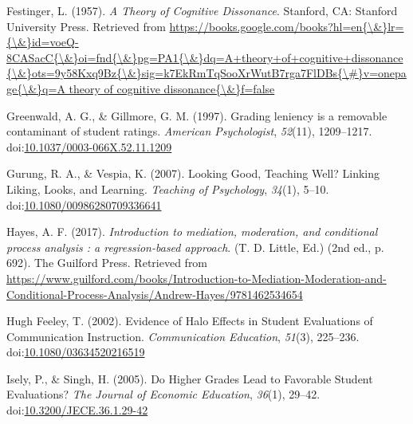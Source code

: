 \documentclass[man]{apa6}
\theoremstyle{definition}
\theoremstyle{definition}
\theoremstyle{definition}
\theoremstyle{remark}
\begin{document}
\leavevmode\hypertarget{ref-Festinger1957}{}%
Festinger, L. (1957). \emph{A Theory of Cognitive Dissonance}. Stanford,
CA: Stanford University Press. Retrieved from
\href{https://books.google.com/books?hl=en\%7B/\&\%7Dlr=\%7B/\&\%7Did=voeQ-8CASacC\%7B/\&\%7Doi=fnd\%7B/\&\%7Dpg=PA1\%7B/\&\%7Ddq=A+theory+of+cognitive+dissonance\%7B/\&\%7Dots=9y58Kxq9Bz\%7B/\&\%7Dsig=k7EkRmTqSooXrWutB7rga7FlDBs\%7B/\#\%7Dv=onepage\%7B/\&\%7Dq=A\%20theory\%20of\%20cognitive\%20dissonance\%7B/\&\%7Df=false}{https://books.google.com/books?hl=en\{\textbackslash{}\&\}lr=\{\textbackslash{}\&\}id=voeQ-8CASacC\{\textbackslash{}\&\}oi=fnd\{\textbackslash{}\&\}pg=PA1\{\textbackslash{}\&\}dq=A+theory+of+cognitive+dissonance\{\textbackslash{}\&\}ots=9y58Kxq9Bz\{\textbackslash{}\&\}sig=k7EkRmTqSooXrWutB7rga7FlDBs\{\textbackslash{}\#\}v=onepage\{\textbackslash{}\&\}q=A theory of cognitive dissonance\{\textbackslash{}\&\}f=false}

\leavevmode\hypertarget{ref-Greenwald1997}{}%
Greenwald, A. G., \& Gillmore, G. M. (1997). Grading leniency is a
removable contaminant of student ratings. \emph{American Psychologist},
\emph{52}(11), 1209--1217.
doi:\href{https://doi.org/10.1037/0003-066X.52.11.1209}{10.1037/0003-066X.52.11.1209}

\leavevmode\hypertarget{ref-Gurung2007}{}%
Gurung, R. A., \& Vespia, K. (2007). Looking Good, Teaching Well?
Linking Liking, Looks, and Learning. \emph{Teaching of Psychology},
\emph{34}(1), 5--10.
doi:\href{https://doi.org/10.1080/00986280709336641}{10.1080/00986280709336641}

\leavevmode\hypertarget{ref-Hayes2017}{}%
Hayes, A. F. (2017). \emph{Introduction to mediation, moderation, and
conditional process analysis : a regression-based approach}. (T. D.
Little, Ed.) (2nd ed., p. 692). The Guilford Press. Retrieved from
\url{https://www.guilford.com/books/Introduction-to-Mediation-Moderation-and-Conditional-Process-Analysis/Andrew-Hayes/9781462534654}

\leavevmode\hypertarget{ref-HughFeeley2002}{}%
Hugh Feeley, T. (2002). Evidence of Halo Effects in Student Evaluations
of Communication Instruction. \emph{Communication Education},
\emph{51}(3), 225--236.
doi:\href{https://doi.org/10.1080/03634520216519}{10.1080/03634520216519}

\leavevmode\hypertarget{ref-Isely2005}{}%
Isely, P., \& Singh, H. (2005). Do Higher Grades Lead to Favorable
Student Evaluations? \emph{The Journal of Economic Education},
\emph{36}(1), 29--42.
doi:\href{https://doi.org/10.3200/JECE.36.1.29-42}{10.3200/JECE.36.1.29-42}
\end{document}
